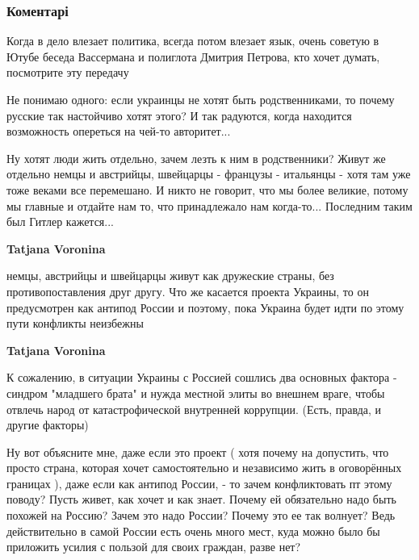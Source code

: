  
 
 
 
 
\subsubsection{Коментарі}
\label{sec:13_11_2021.fb.kyshtymov_aleksandr.1.russkie_i_ukraincy.cmt}

\begin{itemize} %

Когда в дело влезает политика, всегда потом влезает язык, очень советую в Ютубе
беседа Вассермана и полиглота Дмитрия Петрова, кто хочет думать, посмотрите эту
передачу



Не понимаю одного: если украинцы не хотят быть родственниками, то почему
русские так настойчиво хотят этого? И так радуются, когда находится возможность
опереться на чей-то авторитет...

Ну хотят люди жить отдельно, зачем лезть к ним в родственники? Живут же
отдельно немцы и австрийцы, швейцарцы - французы - итальянцы - хотя там уже
тоже веками все перемешано. И никто не говорит, что мы более великие, потому мы
главные и отдайте нам то, что принадлежало нам когда-то... Последним таким был
Гитлер кажется...

\begin{itemize} %
\textbf{Tatjana Voronina} 

немцы, австрийцы и швейцарцы живут как дружеские страны, без противопоставления
друг другу. Что же касается проекта Украины, то он предусмотрен как антипод
России и поэтому, пока Украина будет идти по этому пути конфликты неизбежны


\textbf{Tatjana Voronina} 

К сожалению, в ситуации Украины с Россией сошлись два основных фактора -
синдром "младшего брата" и нужда местной элиты во внешнем враге, чтобы отвлечь
народ от катастрофической внутренней коррупции. (Есть, правда, и другие
факторы)



Ну вот объясните мне, даже если это проект ( хотя почему на допустить, что
просто страна, которая хочет самостоятельно и независимо жить в оговорённых
границах ), даже если как антипод России, - то зачем конфликтовать пт этому
поводу? Пусть живет, как хочет и как знает. Почему ей обязательно надо быть
похожей на Россию? Зачем это надо России? Почему это ее так волнует? Ведь
действительно в самой России есть очень много мест, куда можно было бы
приложить усилия с пользой для своих граждан, разве нет?


\end{itemize}
\end{itemize}
